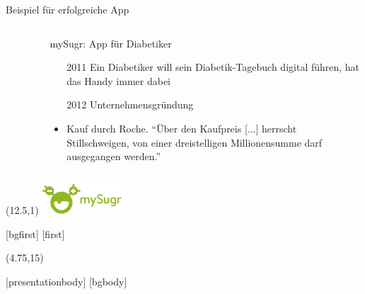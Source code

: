 \documentclass[aspectratio=169,t]{beamer}
\begin{document}
\begin{frame}{Beispiel für erfolgreiche App}
\begin{columns}
\begin{column}{0.6\textwidth}
\begin{figure}
            \end{figure}    
        \end{column}
        \begin{column}{0.4\textwidth}
            \noindent mySugr: App für Diabetiker
            \begin{itemize}
                \item[2011] Ein Diabetiker will sein Diabetik-Tagebuch digital führen, hat das Handy immer dabei
                \item[2012] Unternehmensgründung
                \item<2->[2017] Kauf durch Roche. ``Über den Kaufpreis [...] herrscht Stillschweigen, von einer dreistelligen Millionensumme darf ausgegangen werden.'' \cite{mysugrverkauf}
            \end{itemize}
        \end{column}
    \end{columns}
    \begin{textblock}{15}(12.5,1)
        \includegraphics[width=3cm]{Bilder/mysugrlogo.png}
    \end{textblock}
\end{frame}


[bgfirst]
[first]
\subtitle{\theslidesection: Technische Grundlagen}
\begin{frame}[noframenumbering]
    \titlepage
    \begin{textblock}{10}(4.75,15)
        \cite{ProgrammingLogo}
    \end{textblock}
\end{frame}
[presentationbody] 
[bgbody]
\end{document}
